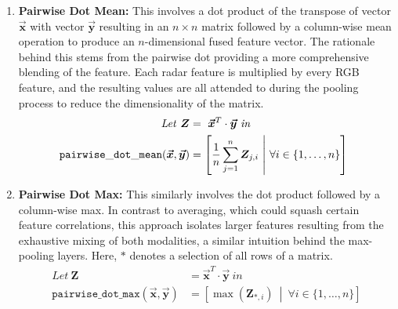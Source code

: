 \documentclass{mpaper}
\begin{document}
\begin{enumerate}
    \item \textbf{Pairwise Dot Mean:} This involves a dot product of the transpose of vector $\bm{\vec{x}}$ with vector $\bm{\vec{y}}$ resulting in an $n \times n$ matrix followed by a column-wise mean operation to produce an $n$-dimensional fused feature vector. The rationale behind this stems from the pairwise dot providing a more comprehensive blending of the feature. Each radar feature is multiplied by every RGB feature, and the resulting values are all attended to during the pooling process to reduce the dimensionality of the matrix.
    \begin{align*}
        \mathit{Let} \ \bm{Z} & = \ \bm{\vec{x}}^T \cdot \bm{\vec{y}} \ \mathit{in} \\
        \hspace{-0.2cm}\mathtt{pairwise\_dot\_mean}(\bm{\vec{x}}, \bm{\vec{y}}) &= \left[ \frac{1}{n} \sum_{j=1}^n \bm{Z}_{j,i} \ \middle| \ \forall i \in \{1, \ldots, n\}\right]
    \end{align*}
    
    \item \textbf{Pairwise Dot Max:} This similarly involves the dot product followed by a column-wise max. In contrast to averaging, which could squash certain feature correlations, this approach isolates larger features resulting from the exhaustive mixing of both modalities, a similar intuition behind the max-pooling layers. Here, $*$ denotes a selection of all rows of a matrix.
    \begin{align*}
        \mathit{Let} \ \bm{Z} & = \bm{\vec{x}}^T \cdot \bm{\vec{y}} \ \mathit{in} \\
        \mathtt{pairwise\_dot\_max}(\bm{\vec{x}}, \bm{\vec{y}}) &= \left[ \max(\bm{Z}_{*,i}) \ \middle| \ \forall i \in \{1, \ldots, n\} \right]
    \end{align*}
    

\end{enumerate}
\end{document}
